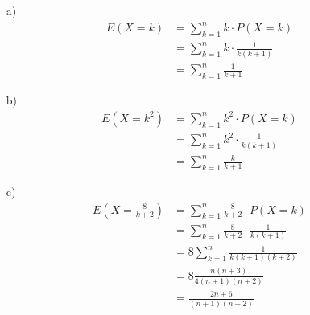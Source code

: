 \begin{enumerate}
	\item[a)]
		\begin{equation*}
			\begin{split}
				E(X = k) 	&= \sum_{k=1}^{n} k \cdot P(X = k)\\
						&= \sum_{k=1}^{n} k \cdot \frac{1}{k(k+1)}\\
						&= \sum_{k=1}^{n}\frac{1}{k+1}
			\end{split}
		\end{equation*}
	\item[b)]
				\begin{equation*}
					\begin{split}
						E(X = k^2) 	&= \sum_{k=1}^{n} k^2 \cdot P(X = k)\\
								&= \sum_{k=1}^{n} k^2 \cdot \frac{1}{k(k+1)}\\
								&= \sum_{k=1}^{n}\frac{k}{k+1}
					\end{split}
				\end{equation*}
	\item[c)] 
				\begin{equation*}
					\begin{split}
						E(X = \frac{8}{k+2}) 	&= \sum_{k=1}^{n} \frac{8}{k+2} \cdot P(X = k)\\
								&= \sum_{k=1}^{n} \frac{8}{k+2} \cdot \frac{1}{k(k+1)}\\
								&= 8 \sum_{k=1}^{n}\frac{1}{k(k+1)(k+2)}\\
								&= 8 \frac{n(n+3)}{4(n+1)(n+2)}\\
								&= \frac{2n+6}{(n+1)(n+2)}
					\end{split}
				\end{equation*}
\end{enumerate}